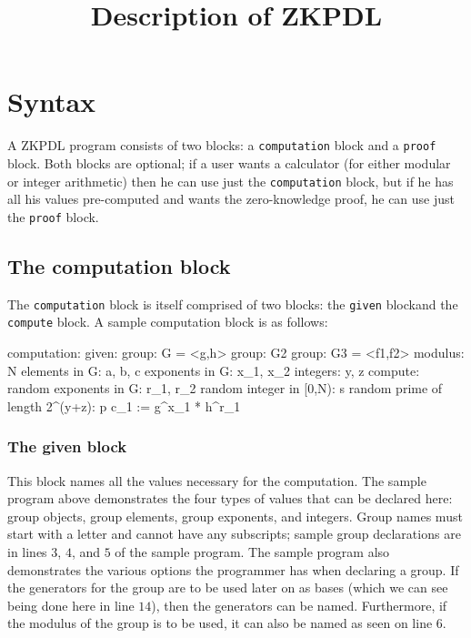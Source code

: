 \documentclass[letterpaper,11pt]{article}
\title{Description of ZKPDL}
\begin{document}
\maketitle


\section{Syntax}\label{sec:syntax}

A ZKPDL program consists of two blocks: a \verb#computation# block and a
\verb#proof# block.
Both blocks are optional; if a user wants a calculator (for either modular or
integer arithmetic) then he can use just the \verb#computation# block, but if he 
has all
his values pre-computed and wants the zero-knowledge proof, he can use just
the \verb#proof# block.

\subsection{The computation block}\label{sec:computation}

The \verb#computation# block is itself comprised of two blocks: the 
\verb#given# blockand the \verb#compute# block.  A sample computation block is
as follows:

\begin{ZKPVerbatim}
computation:
	given: 
		group: G = <g,h>
		group: G2
		group: G3 = <f1,f2>
			modulus: N
		elements in G: a, b, c
		exponents in G: x_1, x_2
		integers: y, z
	compute:
		random exponents in G: r_1, r_2
		random integer in [0,N): s
		random prime of length 2^(y+z): p
		c_1 := g^x_1 * h^r_1
\end{ZKPVerbatim}

\subsubsection{The given block}\label{sec:given}

This block names all the values necessary for the computation.  The sample
program above demonstrates the four types of values that can be declared here: 
group objects, group elements, group exponents, and integers.  Group names
must start with a letter and cannot have any subscripts; sample group
declarations are in lines $3$, $4$, and $5$ of the sample program.  The sample
program also demonstrates the various options the programmer has when
declaring a group.  If the generators for the group are to be used later on as
bases (which we can see being done here in line $14$), then the generators can
be named.  Furthermore, if the modulus of the group is to be used, it can also
be named as seen on line $6$.  
\end{document}
